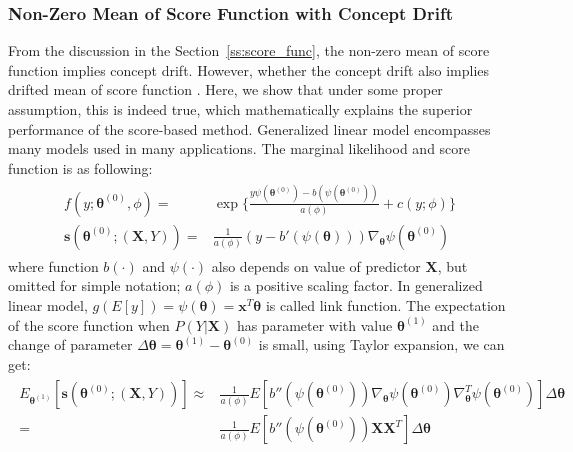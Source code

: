 \documentclass[twoside,11pt]{article}
\begin{document}
\subsubsection{Non-Zero Mean of Score Function with Concept Drift}
\label{ss:non_zero_mean_score}
From the discussion in the Section~\ref{ss:score_func}, the non-zero mean of score function implies concept drift. However, whether the concept drift also implies drifted mean of score function . Here, we show that under some proper assumption, this is indeed true, which mathematically explains the superior performance of the score-based method. Generalized linear model encompasses many models used in many applications. The marginal likelihood and score function is as following:
\begin{align}
\begin{aligned}
f(y;\bm { \theta} ^{(0)}, \phi) =& \exp\{\frac{y \psi(\bm { \theta} ^{(0)})-b( \psi(\bm { \theta} ^{(0)}))}{ a ( \phi)} + c(y; \phi)\} \\
\bm {s}(\bm { \theta} ^{(0)};(\bm {X}, Y)) =& \frac{1}{a( \phi)}(y - b'( \psi (\bm { \theta})))\nabla _{ \bm { \theta}} \psi(\bm { \theta} ^{(0)})
\end{aligned}
\label{eqn:score_glm}
\end{align}
where function $b(\cdot)$ and $ \psi(\cdot)$ also depends on value of predictor $\bm { X}$, but omitted for simple notation; $ a ( \phi)$ is a positive scaling factor. In generalized linear model, $ g(E[y]) = \psi ( \bm { \theta})=\bm {x}^T\bm { \theta}$ is called link function. The expectation of the score function when $P(Y|\bm {X})$ has parameter with value $\bm { \theta} ^{(1)}$ and the change of parameter $ \Delta \bm { \theta}= \bm { \theta}^{(1)}-\bm { \theta}^{(0)}$ is small, using Taylor expansion, we can get:
\begin{align}
\begin{aligned}
E _{\bm { \theta} ^{(1)}}[\bm {s}(\bm { \theta} ^{(0)};(\bm {X}, Y))] \approx& \frac{1}{a ( \phi)}E[b''( \psi( \bm { \theta} ^{(0)}))\nabla _{ \bm { \theta}} \psi ( \bm { \theta} ^{ (0)}) \nabla _{ \bm { \theta}}^T \psi ( \bm { \theta} ^{ (0)})] \Delta \bm { \theta} \\
=& \frac{1}{a ( \phi)}E[b''( \psi( \bm { \theta} ^{(0)}))\bm {X}\bm {X}^T] \Delta \bm { \theta}
\end{aligned}
\label{eqn:exp_score_glm}
\end{align}
\end{document}

